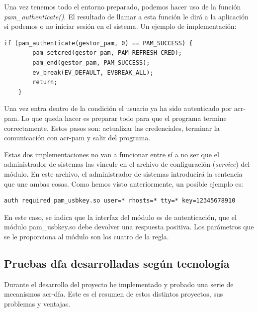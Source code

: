 \documentclass[twoside, titlepage, 12pt, a4paper]{article}
\begin{document}
{Una vez tenemos todo el entorno preparado, podemos hacer uso de la función \textit{pam\_authenticate()}. El resultado de llamar a esta función le dirá a la aplicación si podemos o no iniciar sesión en el sistema. Un ejemplo de implementación:
\begin{lstlisting}[xleftmargin=.07\textwidth]
    if (pam_authenticate(gestor_pam, 0) == PAM_SUCCESS) {
        pam_setcred(gestor_pam, PAM_REFRESH_CRED);
        pam_end(gestor_pam, PAM_SUCCESS);
        ev_break(EV_DEFAULT, EVBREAK_ALL);
        return;
    }
\end{lstlisting}
Una vez entra dentro de la condición el usuario ya ha sido autenticado por \gls{acr-pam}. Lo que queda hacer es preparar todo para que el programa termine correctamente. Estos pasos son: actualizar las credenciales, terminar la comunicación con \gls{acr-pam} y salir del programa.\par
Estas dos implementaciones no van a funcionar entre sí a no ser que el administrador de sistemas las vincule en el archivo de configuración (\textit{service}) del módulo. En este archivo, el administrador de sistemas introducirá la sentencia que une ambas cosas. Como hemos visto anteriormente, un posible ejemplo es:
\begin{lstlisting}
auth required pam_usbkey.so user=* rhosts=* tty=* key=12345678910
\end{lstlisting}
En este caso, se indica que la interfaz del módulo es de autenticación, que el módulo pam\_usbkey.so debe devolver una respuesta positiva. Los parámetros que se le proporciona al módulo son los cuatro de la regla.
\subsection{Pruebas \gls{dfa} desarrolladas según tecnología}
Durante el desarrollo del proyecto he implementado y probado una serie de mecanismos \gls{acr-dfa}. Este es el resumen de estos distintos proyectos, sus problemas y ventajas.
}
\end{document}
